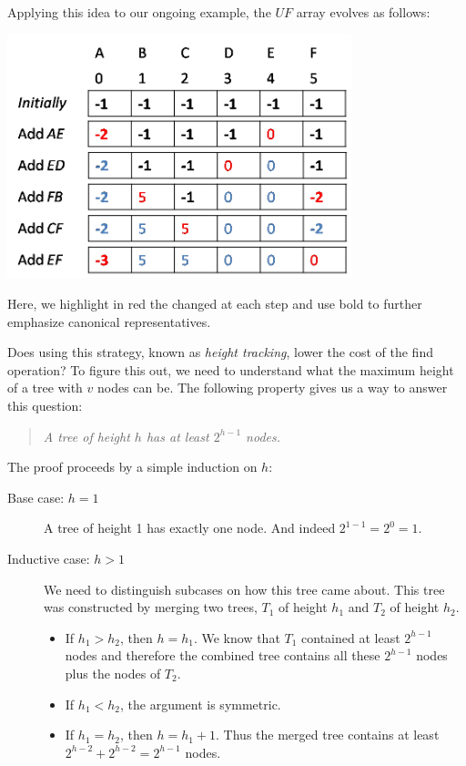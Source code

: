 Applying this idea to our ongoing example, the $\mathit{UF}$ array evolves as
follows:
\begin{center}
  \includegraphics[width=0.75\textwidth]{img/ufs-ht.png}
\end{center}
Here, we highlight in red the changed at each step and use bold to
further emphasize canonical representatives.

Does using this strategy, known as \emph{height tracking}, lower the
cost of the find operation?  To figure this out, we need to understand
what the maximum height of a tree with $v$ nodes can be.  The
following property gives us a way to answer this question:
\begin{quote}\em
  A tree of height $h$ has at least $2^{h-1}$ nodes.
\end{quote}
The proof proceeds by a simple induction on $h$:
\begin{description}
\item[Base case: $h=1$] %
  A tree of height 1 has exactly one node.  And indeed $2^{1-1} = 2^0
  = 1$.

\item[Inductive case: $h > 1$] %
  We need to distinguish subcases on how this tree came about.  This
  tree was constructed by merging two trees, $T_1$ of height $h_1$
  and $T_2$ of height $h_2$.
  \begin{itemize}
  \item%
    If $h_1 > h_2$, then $h = h_1$.  We know that $T_1$ contained at
    least $2^{h-1}$ nodes and therefore the combined tree contains all
    these $2^{h-1}$ nodes plus the nodes of $T_2$.
  \item%
    If $h_1 < h_2$, the argument is symmetric.
  \item%
    If $h_1 = h_2$, then $h = h_1 + 1$.  Thus the merged tree contains
    at least $2^{h-2} + 2^{h-2} = 2^{h-1}$ nodes.
  \end{itemize}
\end{description}


